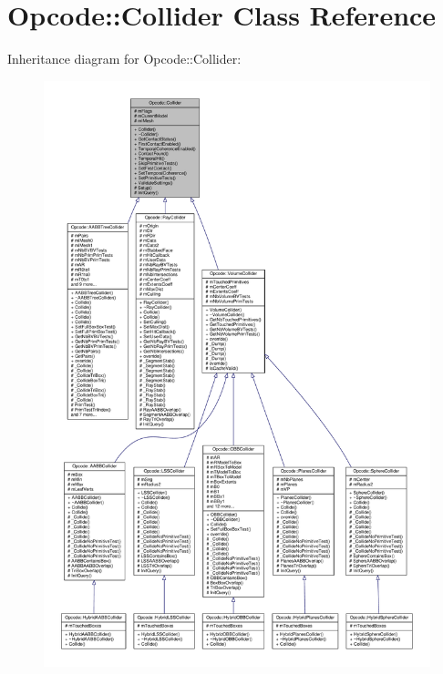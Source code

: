 \hypertarget{classOpcode_1_1Collider}{}\section{Opcode\+:\+:Collider Class Reference}
\label{classOpcode_1_1Collider}


Inheritance diagram for Opcode\+:\+:Collider\+:
\nopagebreak
\begin{figure}[H]
\begin{center}
\leavevmode
\includegraphics[width=350pt]{d9/d4f/classOpcode_1_1Collider__inherit__graph}
\end{center}
\end{figure}


